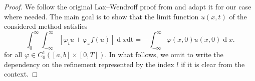 \documentclass[final,11pt, times, linenumber, nopreprintline]{elsarticle}
\let\phi\varphi
\newcommand{\dx}{\operatorname{d}\!x}
\begin{document}
\begin{proof}
		We follow the original Lax--Wendroff proof from \cite{lax_systems_1960,leveque_numerical_1992} and adapt it for our case where needed. The main goal is to show that the limit function $u(x,t)$ of the considered method satisfies
	\begin{equation}
		\int_{0}^{\infty} \int_{-\infty}^{\infty} [\phi_t u + \phi_x f(u)]\dx \mathrm{dt} = - \int_{-\infty}^{\infty} \phi(x,0)u(x,0) \dx.
		\label{eq:weak_LW}
	\end{equation}
     for all $\phi \in C_0^1([a,b]\times [0,T])$. In what follows, we omit to write the dependency on the refinement represented by the index $l$ if it is clear from the context. 
     

\end{proof}
\end{document}
